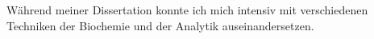 
    {Während meiner Dissertation konnte ich mich intensiv mit verschiedenen Techniken der Biochemie und der Analytik auseinandersetzen. }
